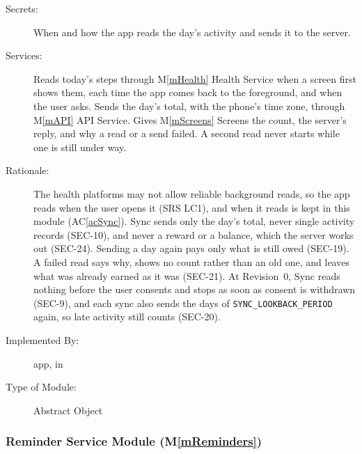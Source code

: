 \documentclass[12pt, titlepage]{article}
\newcommand{\acref}[1]{AC\ref{#1}}
\newcommand{\mref}[1]{M\ref{#1}}
\begin{document}
\begin{description}
\item[Secrets:] When and how the app reads the day's activity and sends it to the server.
\item[Services:] Reads today's steps through \mref{mHealth} Health Service when a screen first shows them, each time the app comes back to the foreground, and when the user asks. Sends the day's total, with the phone's time zone, through \mref{mAPI} API Service. Gives \mref{mScreens} Screens the count, the server's reply, and why a read or a send failed. A second read never starts while one is still under way.
\item[Rationale:] The health platforms may not allow reliable background reads, so the app reads when the user opens it (SRS LC1), and when it reads is kept in this module (\acref{acSync}). Sync sends only the day's total, never single activity records (SEC-10), and never a reward or a balance, which the server works out (SEC-24). Sending a day again pays only what is still owed (SEC-19). A failed read says why, shows no count rather than an old one, and leaves what was already earned as it was (SEC-21). At Revision~0, Sync reads nothing before the user consents and stops as soon as consent is withdrawn (SEC-9), and each sync also sends the days of \texttt{SYNC\_LOOKBACK\_PERIOD} again, so late activity still counts (SEC-20).
\item[Implemented By:] \progname{} app, in 
\item[Type of Module:] Abstract Object
\end{description}


\subsubsection{Reminder Service Module (\mref{mReminders})}
\end{document}
